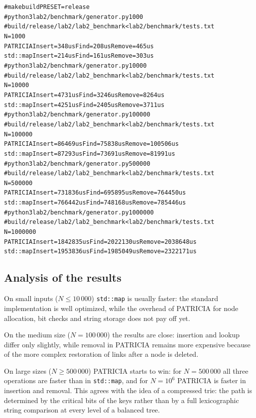 \begin{alltt}
# make build PRESET=release
# python3 lab2/benchmark/generator.py 1000
# build/release/lab2/lab2_benchmark < lab2/benchmark/tests.txt
N=1000
PATRICIA  Insert=348us Find=208us Remove=465us
std::map  Insert=214us Find=161us Remove=303us
# python3 lab2/benchmark/generator.py 10000
# build/release/lab2/lab2_benchmark < lab2/benchmark/tests.txt
N=10000
PATRICIA  Insert=4731us Find=3246us Remove=8264us
std::map  Insert=4251us Find=2405us Remove=3711us
# python3 lab2/benchmark/generator.py 100000
# build/release/lab2/lab2_benchmark < lab2/benchmark/tests.txt
N=100000
PATRICIA  Insert=86469us Find=75838us Remove=100506us
std::map  Insert=87293us Find=73691us Remove=81991us
# python3 lab2/benchmark/generator.py 500000
# build/release/lab2/lab2_benchmark < lab2/benchmark/tests.txt
N=500000
PATRICIA  Insert=731836us Find=695895us Remove=764450us
std::map  Insert=766442us Find=748168us Remove=785446us
# python3 lab2/benchmark/generator.py 1000000
# build/release/lab2/lab2_benchmark < lab2/benchmark/tests.txt
N=1000000
PATRICIA  Insert=1842835us Find=2022130us Remove=2038648us
std::map  Insert=1953836us Find=1985049us Remove=2322171us
\end{alltt}

\subsection{Analysis of the results}

On small inputs ($N \leq 10\,000$) \texttt{std::map} is usually faster: the standard
implementation is well optimized, while the overhead of PATRICIA for node allocation, bit checks
and string storage does not pay off yet.

On the medium size ($N = 100\,000$) the results are close: insertion and lookup differ only
slightly, while removal in PATRICIA remains more expensive because of the more complex restoration
of links after a node is deleted.

On large sizes ($N \geq 500\,000$) PATRICIA starts to win: for $N = 500\,000$ all three
operations are faster than in \texttt{std::map}, and for $N = 10^6$ PATRICIA is faster in
insertion and removal. This agrees with the idea of a compressed trie: the
path is determined by the critical bits of the keys rather than by a full lexicographic string
comparison at every level of a balanced tree.

\pagebreak

